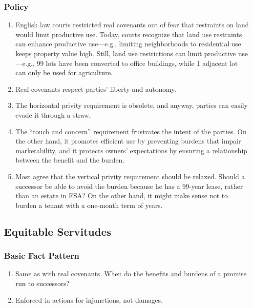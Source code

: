 \subsubsection{Policy}

\begin{enumerate}
    \item English law courts restricted real covenants out of fear that 
    restraints on land would limit productive use. Today, courts recognize 
    that land use restraints can enhance productive use---e.g., limiting 
    neighborhoods to residential use keeps property value high. Still, land 
    use restrictions can limit productive use---e.g., 99 lots have been 
    converted to office buildings, while 1 adjacent lot can only be used for 
    agriculture.
    \item Real covenants respect parties' liberty and autonomy.
    \item The horizontal privity requirement is obsolete, and anyway, parties 
    can easily evade it through a straw.
    \item The ``touch and concern'' requirement frustrates the intent of the 
    parties. On the other hand, it promotes efficient use by preventing 
    burdens that impair marketability, and it protects owners' expectations by 
    ensuring a relationship between the benefit and the burden.
    \item Most agree that the vertical privity requirement should be relaxed. 
    Should a successor be able to avoid the burden because he has a 99-year 
    lease, rather than an estate in FSA? On the other hand, it might make 
    sense not to burden a tenant with a one-month term of years.
\end{enumerate}

\subsection{Equitable Servitudes}

\subsubsection{Basic Fact Pattern}

\begin{enumerate}
    \item Same as with real covenants. When do the benefits and burdens of a 
    promise run to successors?
    \item Enforced in actions for injunctions, not damages.
\end{enumerate}

